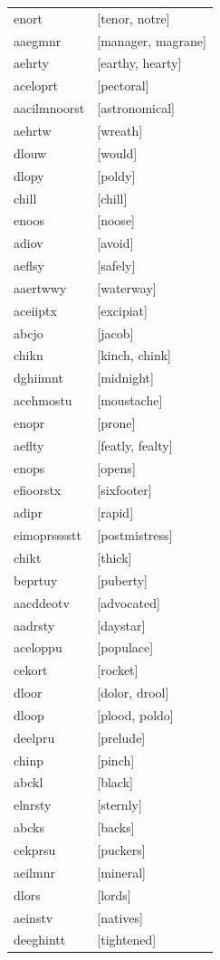 \documentclass{article}
\begin{document}
\begin{tabular}{ll}
enort & [tenor, notre] \\
aaegmnr & [manager, magrane] \\
aehrty & [earthy, hearty] \\
aceloprt & [pectoral] \\
aacilmnoorst & [astronomical] \\
aehrtw & [wreath] \\
dlouw & [would] \\
dlopy & [poldy] \\
chill & [chill] \\
enoos & [noose] \\
adiov & [avoid] \\
aeflsy & [safely] \\
aaertwwy & [waterway] \\
aceiiptx & [excipiat] \\
abcjo & [jacob] \\
chikn & [kinch, chink] \\
dghiimnt & [midnight] \\
acehmostu & [moustache] \\
enopr & [prone] \\
aeflty & [featly, fealty] \\
enops & [opens] \\
efioorstx & [sixfooter] \\
adipr & [rapid] \\
eimoprsssstt & [postmistress] \\
chikt & [thick] \\
beprtuy & [puberty] \\
aacddeotv & [advocated] \\
aadrsty & [daystar] \\
aceloppu & [populace] \\
cekort & [rocket] \\
dloor & [dolor, drool] \\
dloop & [plood, poldo] \\
deelpru & [prelude] \\
chinp & [pinch] \\
abckl & [black] \\
elnrsty & [sternly] \\
abcks & [backs] \\
cekprsu & [puckers] \\
aeilmnr & [mineral] \\
dlors & [lords] \\
aeinstv & [natives] \\
deeghintt & [tightened] \\

\end{tabular}
\end{document}
